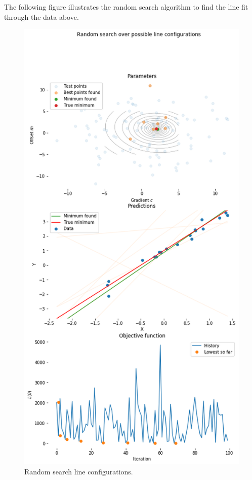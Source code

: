 \documentclass[a4paper, openany]{memoir}
\begin{document}
The following figure illustrates the random search algorithm to find the line fit through the data above.
\begin{figure}[H]
    \centering
    \includegraphics[scale=0.5]{src/4.15 random search line configurations.png}
    \caption{Random search line configurations.}
\end{figure}
\end{document}
